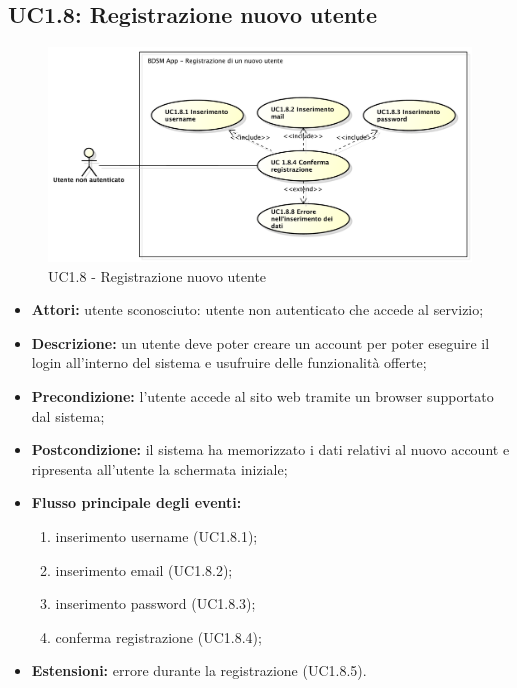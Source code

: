 \pagebreak


\subsection{UC1.8: Registrazione nuovo utente}

\begin{figure}[!htbp]
    \centering
    \centerline{\includegraphics[scale=0.45]{./images/UC1_8.pdf}}
    \caption{UC1.8 - Registrazione nuovo utente}
\end{figure}

\begin{itemize}
   	\item \textbf{Attori:} utente sconosciuto: utente non autenticato che accede al servizio;
    \item \textbf{Descrizione:} un utente deve poter creare un account per poter eseguire il login
    all'interno del sistema e usufruire delle funzionalità offerte;
    \item \textbf{Precondizione:} l'utente accede al sito web tramite un browser supportato
    dal sistema;
    \item \textbf{Postcondizione:} il sistema ha memorizzato i dati relativi al nuovo account e
    ripresenta all'utente la schermata iniziale;
    \item \textbf{Flusso principale degli eventi:}
    \begin{enumerate}
        \item inserimento username (UC1.8.1);
        \item inserimento email (UC1.8.2);
        \item inserimento password (UC1.8.3);
        \item conferma registrazione (UC1.8.4);
    \end{enumerate}
    \item \textbf{Estensioni:} errore durante la registrazione (UC1.8.5).
\end{itemize}


